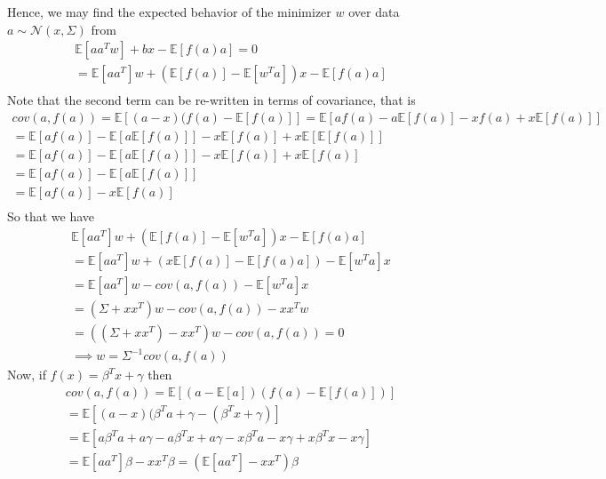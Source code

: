         Hence, we may find the expected behavior of the minimizer $w$ over data $a\sim \mathcal{N}(x,\Sigma)$ from
        \begin{align*}
            \mathds{E}[aa^Tw] + bx - \mathds{E}[f(a)a] = 0 \\
            = \mathds{E}[aa^T]w + (\mathds{E}[f(a)] - \mathbb{E}[w^Ta])x - \mathds{E}[f(a)a] \\
        \end{align*}
        Note that the second term can be re-written in terms of covariance, that is
        \begin{align*}
            cov(a,f(a))=\mathds{E}[(a-x)(f(a)-\mathds{E}[f(a)]]=\mathds{E}[af(a) - a\mathds{E}[f(a)] - xf(a) + x\mathds{E}[f(a)]] \\
            = \mathds{E}[af(a)] - \mathds{E}[a\mathds{E}[f(a)]] - x\mathds{E}[f(a)] + x\mathds{E}[\mathds{E}[f(a)]] \\
            = \mathds{E}[af(a)] - \mathds{E}[a\mathds{E}[f(a)]] - x\mathds{E}[f(a)] + x\mathds{E}[f(a)] \\
            = \mathds{E}[af(a)] - \mathds{E}[a\mathds{E}[f(a)]] \\
            = \mathds{E}[af(a)] - x\mathds{E}[f(a)] \\ %
         \end{align*}
         So that we have 
         \begin{align*}
            \mathds{E}[aa^T]w + (\mathds{E}[f(a)] - \mathbb{E}[w^Ta])x - \mathds{E}[f(a)a] \\
            = \mathds{E}[aa^T]w + (x\mathds{E}[f(a)] - \mathds{E}[f(a)a]) - \mathbb{E}[w^Ta]x  \\
            = \mathds{E}[aa^T]w - cov(a,f(a)) - \mathbb{E}[w^Ta]x  \\
            = (\Sigma + xx^T)w - cov(a,f(a)) - xx^Tw \\
            = ((\Sigma + xx^T) - xx^T)w - cov(a,f(a)) = 0 \\
            \implies w = \Sigma^{-1}cov(a,f(a))
         \end{align*}
         Now, if $f(x)=\beta^Tx + \gamma$ then 
         \begin{align*}
            cov(a,f(a)) = \mathds{E}[(a-\mathds{E}[a])(f(a)-\mathds{E}[f(a)])] \\
            = \mathds{E}[(a-x)(\beta^Ta + \gamma - (\beta^Tx + \gamma)] \\
            = \mathds{E}[a\beta^Ta + a\gamma - a\beta^Tx + a\gamma - x\beta^T a - x\gamma + x\beta^Tx - x\gamma] \\
            = \mathds{E}[aa^T]\beta - xx^T \beta = (\mathds{E}[aa^T]-xx^T)\beta\\
        \end{align*}
